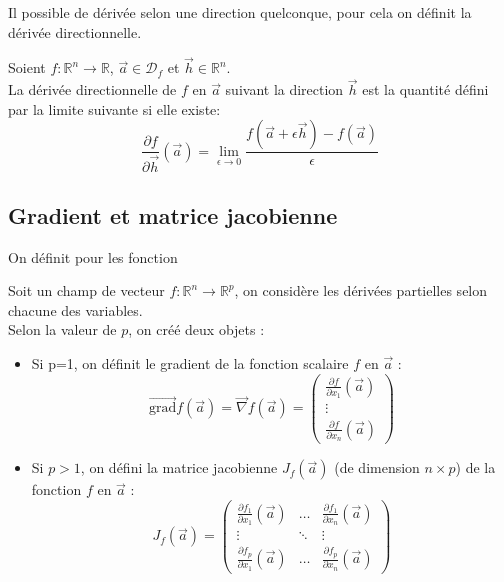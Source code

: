 Il possible de dérivée selon une direction quelconque, pour cela on définit la dérivée directionnelle.
\begin{defi}
    Soient $f:\mathbb{R}^n\to\mathbb{R}$, $\overrightarrow{a}\in\mathscr{D}_f$ et $\overrightarrow{h}\in\mathbb{R}^n$.\\
    La dérivée directionnelle de $f$ en $\overrightarrow{a}$ suivant la direction $\overrightarrow{h}$ est la quantité défini par la limite suivante si elle existe:
    $$\frac{\partial f}{\partial\overrightarrow{h}}(\overrightarrow{a})=\lim_{\epsilon\to 0}\frac{f(\overrightarrow{a}+\epsilon\overrightarrow{h})-f(\overrightarrow{a})}{\epsilon}$$ 
    \newline
\end{defi}
\subsection{Gradient et matrice jacobienne}
On définit pour les fonction
\begin{defi}
Soit un champ de vecteur $f:\mathbb{R}^n\to\mathbb{R}^p$, on considère les dérivées partielles selon chacune des variables.\\
Selon la valeur de $p$, on créé deux objets :
\begin{itemize}
    \item Si  p=1, on définit le gradient de la fonction scalaire $f$ en $\overrightarrow{a}$ : $$\overrightarrow{\text{grad}}f(\overrightarrow{a})=\overrightarrow{\nabla} f(\overrightarrow{a})=\begin{pmatrix}\frac{\partial f}{\partial x_1}(\overrightarrow{a})\\\vdots\\\frac{\partial f}{\partial x_n}(\overrightarrow{a})\end{pmatrix}$$
    \item Si $p>1$, on défini la matrice jacobienne $J_f(\overrightarrow{a})$ (de dimension $n\times p$) de la fonction $f$ en $\overrightarrow{a}$ : $$J_f(\overrightarrow{a})=\begin{pmatrix}\frac{\partial f_1}{\partial x_1}(\overrightarrow{a})&\hdots&\frac{\partial f_1}{\partial x_n}(\overrightarrow{a})\\ \vdots & \ddots & \vdots\\ \frac{\partial f_p}{\partial x_1}(\overrightarrow{a}) & \hdots & \frac{\partial f_p}{\partial x_n}(\overrightarrow{a})\end{pmatrix}$$
\end{itemize}
\end{defi}
